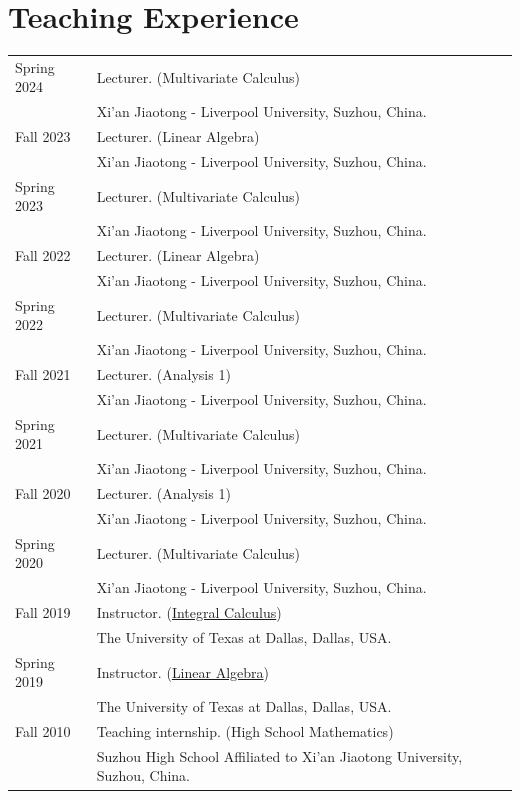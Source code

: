 \documentclass[a4paper,12pt]{article}
\begin{document}
\section*{\Large{Teaching Experience}}
\begin{tabular}{@{}p{1.4in}p{4in}} 
Spring 2024 & Lecturer. (Multivariate Calculus) \\
             & Xi'an Jiaotong - Liverpool University, Suzhou, China.   \\
Fall 2023 & Lecturer. (Linear Algebra) \\
             & Xi'an Jiaotong - Liverpool University, Suzhou, China.   \\
Spring 2023 & Lecturer. (Multivariate Calculus) \\
             & Xi'an Jiaotong - Liverpool University, Suzhou, China.   \\
Fall 2022 & Lecturer. (Linear Algebra) \\
             & Xi'an Jiaotong - Liverpool University, Suzhou, China.   \\
Spring 2022 & Lecturer. (Multivariate Calculus) \\
             & Xi'an Jiaotong - Liverpool University, Suzhou, China.   \\
Fall 2021 & Lecturer. (Analysis 1) \\
               & Xi'an Jiaotong - Liverpool University, Suzhou, China.   \\
Spring 2021 & Lecturer. (Multivariate Calculus) \\
             & Xi'an Jiaotong - Liverpool University, Suzhou, China.   \\
Fall 2020 & Lecturer. (Analysis 1) \\
               & Xi'an Jiaotong - Liverpool University, Suzhou, China.   \\
Spring 2020 & Lecturer. (Multivariate Calculus) \\
             & Xi'an Jiaotong - Liverpool University, Suzhou, China.   \\
Fall 2019 & Instructor. (\href{https://yzhang1616.github.io/calculus19fall/calculus.html}{Integral Calculus}) \\
             & The University of Texas at Dallas, Dallas, USA.   \\
Spring 2019           & Instructor. (\href{https://yzhang1616.github.io/algebra19spring/algebra.html}{Linear Algebra}) \\
                      & The University of Texas at Dallas, Dallas, USA. \\
Fall 2010             & Teaching internship. (High School Mathematics) \\
                      & Suzhou High School Affiliated to Xi'an Jiaotong University, Suzhou, China.                        
\end{tabular}
\end{document}
